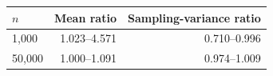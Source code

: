 \begin{tabular}{@{}lrr@{}}
\toprule
\(n\) & Mean ratio & Sampling-variance ratio\\
\midrule
1,000 & 1.023--4.571 & 0.710--0.996\\
50,000 & 1.000--1.091 & 0.974--1.009\\
\bottomrule
\end{tabular}
